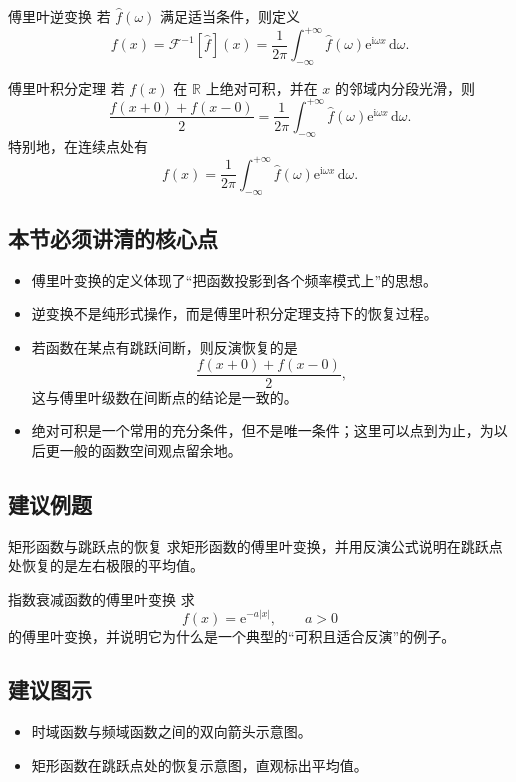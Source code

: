 \begin{dingliyi}{傅里叶逆变换}{}
若 $\hat{f}(\omega)$ 满足适当条件，则定义
\[
    f(x)=\mathcal{F}^{-1}[\hat{f}](x)=\frac{1}{2\pi}\int_{-\infty}^{+\infty} \hat{f}(\omega)\mathrm{e}^{\mathrm{i}\omega x}\,\mathrm{d}\omega.
\]
\end{dingliyi}

\begin{dingli}{傅里叶积分定理}{}
若 $f(x)$ 在 $\mathbb{R}$ 上绝对可积，并在 $x$ 的邻域内分段光滑，则
\[
    \frac{f(x+0)+f(x-0)}{2}
    =
    \frac{1}{2\pi}\int_{-\infty}^{+\infty} \hat{f}(\omega)\mathrm{e}^{\mathrm{i}\omega x}\,\mathrm{d}\omega.
\]
特别地，在连续点处有
\[
    f(x)=\frac{1}{2\pi}\int_{-\infty}^{+\infty} \hat{f}(\omega)\mathrm{e}^{\mathrm{i}\omega x}\,\mathrm{d}\omega.
\]
\end{dingli}

\subsection*{本节必须讲清的核心点}
\begin{itemize}
    \item 傅里叶变换的定义体现了``把函数投影到各个频率模式上''的思想。
    \item 逆变换不是纯形式操作，而是傅里叶积分定理支持下的恢复过程。
    \item 若函数在某点有跳跃间断，则反演恢复的是
    \[
        \frac{f(x+0)+f(x-0)}{2},
    \]
    这与傅里叶级数在间断点的结论是一致的。
    \item 绝对可积是一个常用的充分条件，但不是唯一条件；这里可以点到为止，为以后更一般的函数空间观点留余地。
\end{itemize}

\subsection*{建议例题}
\begin{lizi}{矩形函数与跳跃点的恢复}{}
求矩形函数的傅里叶变换，并用反演公式说明在跳跃点处恢复的是左右极限的平均值。
\end{lizi}

\begin{lizi}{指数衰减函数的傅里叶变换}{}
求
\[
    f(x)=\mathrm{e}^{-a|x|}, \qquad a>0
\]
的傅里叶变换，并说明它为什么是一个典型的``可积且适合反演''的例子。
\end{lizi}

\subsection*{建议图示}
\begin{itemize}
    \item 时域函数与频域函数之间的双向箭头示意图。
    \item 矩形函数在跳跃点处的恢复示意图，直观标出平均值。
\end{itemize}


